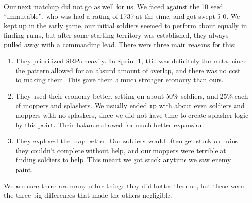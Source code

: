 Our next matchup did not go as well for us. We faced against the 10 seed ``immutable'', who was had a rating of 1737 at the time, and got swept 5-0. We kept up in the early game, our initial soldiers seemed to perform about equally in finding ruins, but after some starting territory was established, they always pulled away with a commanding lead. There were three main reasons for this:
\begin{enumerate}
  \item They prioritized SRPs heavily. In Sprint 1, this was definitely the meta, since the pattern allowed for an absurd amount of overlap, and there was no cost to making them. This gave them a much stronger economy than ours.
  \item They used their economy better, setting on about 50\% soldiers, and 25\% each of moppers and splashers. We usually ended up with about even soldiers and moppers with no splashers, since we did not have time to create splasher logic by this point. Their balance allowed for much better expansion.
  \item They explored the map better. Our soldiers would often get stuck on ruins they couldn't complete without help, and our moppers were terrible at finding soldiers to help. This meant we got stuck anytime we saw enemy paint.
\end{enumerate}
We are sure there are many other things they did better than us, but these were the three big differences that made the others negligible.